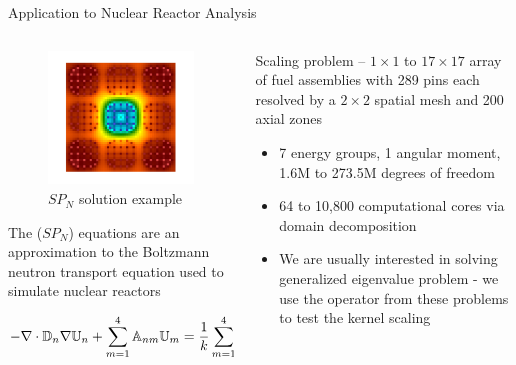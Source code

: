 \documentclass{beamer}
\begin{document}

\begin{frame}{Application to Nuclear Reactor Analysis}
\small
\begin{columns}

    \begin{column}{0.55\textwidth}

      \vspace{-0.2in}
      \begin{figure}
        \centering
        \includegraphics[width=2.0in]{../siam_cse_2015/presentation/prob4}
        \vspace{-0.2in}
        \caption{$SP_N$ solution example}
      \end{figure}

      \vspace{-0.1in}

      The ($SP_N$) equations are an approximation to the Boltzmann neutron
      transport equation used to simulate nuclear reactors

      \vspace{-0.2in}

      \[
        \small
        -\nabla \cdot \mathbb{D}_n \nabla \mathbb{U}_n + \sum_{m=1}^4
        \mathbb{A}_{nm} \mathbb{U}_m = \frac{1}{k} \sum_{m=1}^4
        \mathbb{F}_{nm} \mathbb{U}_m
      \]

    \end{column}

    \begin{column}{0.45\textwidth}
      Scaling problem -- $1 \times 1$ to $17 \times 17$ array of fuel
      assemblies with 289 pins each resolved by a $2 \times 2$ spatial mesh
      and 200 axial zones

      \vfill

      \begin{itemize}
      \item 7 energy groups, 1 angular moment, 1.6M to 273.5M degrees of
        freedom
      \item 64 to 10,800 computational cores via domain decomposition
      \item We are usually interested in solving generalized eigenvalue
        problem - we use the operator from these problems to test the kernel
        scaling
      \end{itemize}
    \end{column}

  \end{columns}

\end{frame}
\end{document}
